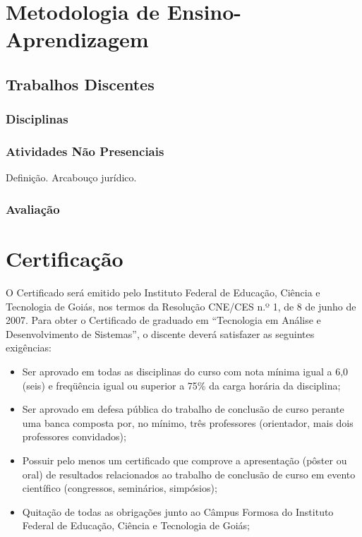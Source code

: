 \documentclass[11pt,fleqn]{book} %
\begin{document}
\section{Metodologia de Ensino-Aprendizagem}\label{metodologia}


\subsection{Trabalhos Discentes}\label{trabdiscentes}

\subsubsection{Disciplinas}\label{dsiciplinas}


\subsubsection{Atividades Não Presenciais}

Definição. Arcabouço jurídico.


\subsubsection{Avaliação}


\section{Certificação}

O Certificado será emitido pelo Instituto Federal de Educação, Ciência e Tecnologia de Goiás, nos termos da Resolução CNE/CES n.º 1, de 8 de junho de 2007.	
Para obter o Certificado de graduado em ``Tecnologia em Análise e Desenvolvimento de Sistemas'', o discente deverá satisfazer as seguintes exigências:
\begin{itemize}
	\item Ser aprovado em todas as disciplinas do curso com nota mínima igual a 6,0 (seis) e freqüência igual ou superior a 75\% da carga horária da disciplina;
	\item Ser aprovado em defesa pública do trabalho de conclusão de curso perante uma banca composta por, no mínimo, três professores (orientador, mais dois professores convidados);
	\item Possuir pelo menos um certificado que comprove a apresentação (pôster ou oral) de resultados relacionados ao trabalho de conclusão de curso em evento científico (congressos, seminários, simpósios);
	\item Quitação de todas as obrigações junto ao Câmpus Formosa do Instituto Federal de Educação, Ciência e Tecnologia de Goiás;
\end{itemize}
\end{document}
